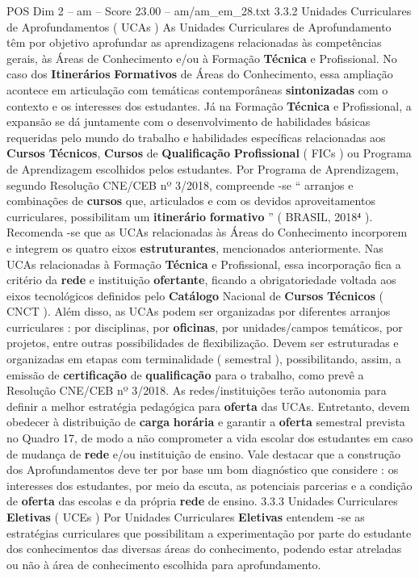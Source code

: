 \begin{textsample}{POS Dim 2 – am – Score 23.00 – am/am\_em\_28.txt}  \label{ex:f2_pos_155}
3.3.2 Unidades Curriculares de Aprofundamentos ( UCAs ) As Unidades Curriculares de Aprofundamento têm por objetivo aprofundar as aprendizagens relacionadas às competências gerais, às Áreas de Conhecimento e/ou à Formação \textbf{Técnica} e Profissional.
No caso dos \textbf{Itinerários} \textbf{Formativos} de Áreas do Conhecimento, essa ampliação acontece em articulação com temáticas contemporâneas \textbf{sintonizadas} com o contexto e os interesses dos estudantes.
Já na Formação \textbf{Técnica} e Profissional, a expansão se dá juntamente com o desenvolvimento de habilidades básicas requeridas pelo mundo do trabalho e habilidades específicas relacionadas aos \textbf{Cursos} \textbf{Técnicos}, \textbf{Cursos} de \textbf{Qualificação} \textbf{Profissional} ( FICs ) ou Programa de Aprendizagem escolhidos pelos estudantes.
Por Programa de Aprendizagem, segundo Resolução CNE/CEB nº 3/2018, compreende -se “ arranjos e combinações de \textbf{cursos} que, articulados e com os devidos aproveitamentos curriculares, possibilitam um \textbf{itinerário} \textbf{formativo} ” ( BRASIL, 2018⁴ ).
Recomenda -se que as UCAs relacionadas às Áreas do Conhecimento incorporem e integrem os quatro eixos \textbf{estruturantes}, mencionados anteriormente.
Nas UCAs relacionadas à Formação \textbf{Técnica} e Profissional, essa incorporação fica a critério da \textbf{rede} e instituição \textbf{ofertante}, ficando a obrigatoriedade voltada aos eixos tecnológicos definidos pelo \textbf{Catálogo} Nacional de \textbf{Cursos} \textbf{Técnicos} ( CNCT ).
Além disso, as UCAs podem ser organizadas por diferentes arranjos curriculares : por disciplinas, por \textbf{oficinas}, por unidades/campos temáticos, por projetos, entre outras possibilidades de flexibilização.
Devem ser estruturadas e organizadas em etapas com terminalidade ( semestral ), possibilitando, assim, a emissão de \textbf{certificação} de \textbf{qualificação} para o trabalho, como prevê a Resolução CNE/CEB nº 3/2018.
As redes/instituições terão autonomia para definir a melhor estratégia pedagógica para \textbf{oferta} das UCAs.
Entretanto, devem obedecer à distribuição de \textbf{carga} \textbf{horária} e garantir a \textbf{oferta} semestral prevista no Quadro 17, de modo a não comprometer a vida escolar dos estudantes em caso de mudança de \textbf{rede} e/ou instituição de ensino.
Vale destacar que a construção dos Aprofundamentos deve ter por base um bom diagnóstico que considere : os interesses dos estudantes, por meio da escuta, as potenciais parcerias e a condição de \textbf{oferta} das escolas e da própria \textbf{rede} de ensino. 3.3.3 Unidades Curriculares \textbf{Eletivas} ( UCEs ) Por Unidades Curriculares \textbf{Eletivas} entendem -se as estratégias curriculares que possibilitam a experimentação por parte do estudante dos conhecimentos das diversas áreas do conhecimento, podendo estar atreladas ou não à área de conhecimento escolhida para aprofundamento.

\end{textsample}
